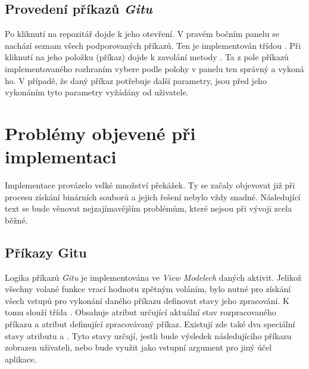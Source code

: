     \subsection{Provedení příkazů \emph{Gitu}}
    Po kliknutí na repozitář dojde k jeho otevření. V pravém bočním panelu se nachází seznam všech podporovaných příkazů. Ten je implementován třídou . Při kliknutí na jeho položku (příkaz) dojde k zavolání metody  . Ta z pole příkazů implementovaného rozhraním  vybere podle polohy v panelu ten správný a vykoná ho. V případě, že daný příkaz potřebuje další parametry, jsou před jeho vykonáním tyto parametry vyžádány od uživatele.

\section{Problémy objevené při implementaci}\label{sec:problemy_implem}
Implementace provázelo velké množství překážek. Ty se začaly objevovat již při procesu získání binárních souborů a jejich řešení nebylo vždy snadné. Následující text se bude věnovat nejzajímavějším problémům, které nejsou při vývoji zcela běžné.

    \subsection{Příkazy Gitu}
    Logika příkazů \emph{Gitu} je implementována ve \emph{View Modelech} daných aktivit. Jelikož všechny volané funkce vrací hodnotu zpětným voláním, bylo nutné pro získání všech vstupů pro vykonání daného příkazu definovat stavy jeho zpracování. K tomu slouží třída . Obsahuje atribut  určující aktuální stav rozpracovaného příkazu a atribut  definující zpracovávaný příkaz. Existují zde také dva speciální stavy atributu   a . Tyto stavy určují, jestli bude výsledek následujícího příkazu zobrazen uživateli, nebo bude využit jako vstupní argument pro jiný účel aplikace.


